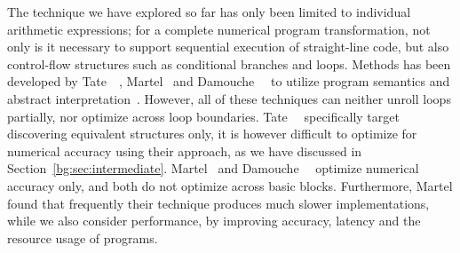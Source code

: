 The technique we have explored so far has only been limited to individual
arithmetic expressions; for a complete numerical program transformation, not
only is it necessary to support sequential execution of straight-line code,
but also control-flow structures such as conditional branches and loops.
Methods has been developed by Tate~\etal~\cite{tate09}, Martel~\cite{martel09}
and Damouche~\etal~\cite{damouche15} to utilize program semantics and
abstract interpretation~\cite{cousot77}.  However, all of these techniques
can neither unroll loops partially, nor optimize across loop boundaries.
Tate~\etal~\cite{tate09} specifically target discovering equivalent structures
only, it is however difficult to optimize for numerical accuracy using
their approach, as we have discussed in Section~\ref{bg:sec:intermediate}.
Martel~\cite{martel09} and Damouche~\etal~\cite{damouche15} optimize
numerical accuracy only, and both do not optimize across basic blocks.
Furthermore, Martel found that frequently their technique produces much slower
implementations,  while we also consider performance, by
improving accuracy, latency and the resource usage of programs.
